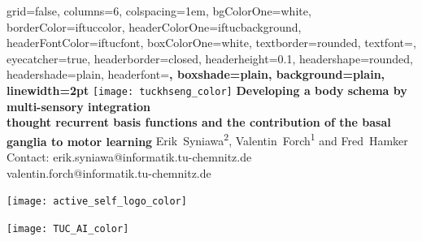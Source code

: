 \documentclass[portrait,final,a0paper,fontscale=0.33]{baposter}
\begin{document}
\begin{poster}%
	{
		grid=false,
		columns=6,
		colspacing=1em,
		bgColorOne=white,
		borderColor=iftuccolor,
		headerColorOne=iftucbackground,
		headerFontColor=iftucfont,
		boxColorOne=white,
		textborder=rounded,
		textfont=\small,
		eyecatcher=true,
		headerborder=closed,
		headerheight=0.1\textheight,
		headershape=rounded,
		headershade=plain,
		headerfont=\Large\bf, %
		boxshade=plain,
		background=plain,
		linewidth=2pt
	}
	{\texttt{[image: tuckhseng\_color]}} 
	{\bf\Large{Developing a body schema by multi-sensory integration \\thought recurrent basis functions and the contribution of the basal ganglia to motor learning}\vspace{1em}}
	{\large Erik~Syniawa\textsuperscript{2}, Valentin~Forch\textsuperscript{1} and Fred~Hamker \\ \vspace{0.5em}
	\small Contact: erik.syniawa@informatik.tu-chemnitz.de \\
	\hspace{43pt} valentin.forch@informatik.tu-chemnitz.de
	}
	{	
		\begin{minipage}[r]{0.1\textwidth}
			\texttt{[image: active\_self\_logo\_color]}
		\end{minipage}
		\hfill
		\begin{minipage}[r]{0.1\textwidth}
			\texttt{[image: TUC\_AI\_color]}
		\end{minipage}
		
	}

\end{poster}
\end{document}
